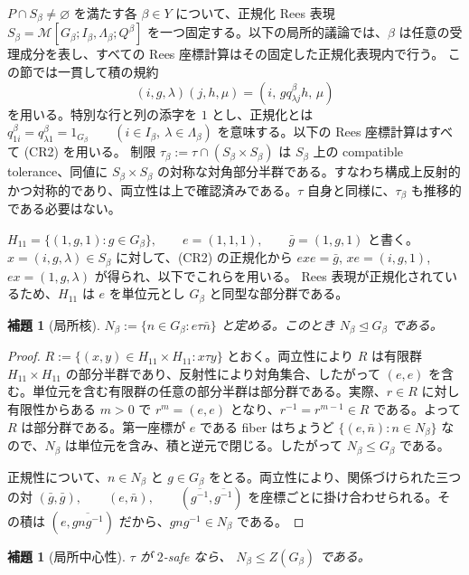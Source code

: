 \documentclass[10pt,a4paper]{ltjsarticle}
\newtheorem{lemma}[theorem]{補題}
\theoremstyle{definition}
\theoremstyle{remark}
\begin{document}
$P\cap S_\beta\ne\varnothing$ を満たす各 \(\beta\in Y\) について、正規化 Rees 表現
\(S_\beta=\mathcal M[G_\beta;I_\beta,\Lambda_\beta;Q^\beta]\)
を一つ固定する。以下の局所的議論では、\(\beta\) は任意の受理成分を表し、すべての Rees 座標計算はその固定した正規化表現内で行う。
この節では一貫して積の規約
\[
(i,g,\lambda)(j,h,\mu)
=
(i,\,gq^\beta_{\lambda j}h,\,\mu)
\tag{CR2}
\]
を用いる。特別な行と列の添字を $1$ とし、正規化とは
\(
q^\beta_{1i}=q^\beta_{\lambda 1}=1_{G_\beta}
\qquad(i\in I_\beta,\ \lambda\in\Lambda_\beta)
\)
を意味する。以下の Rees 座標計算はすべて \textup{(CR2)} を用いる。
制限
\(\tau_\beta:=\tau\cap(S_\beta\times S_\beta)\)
は $S_\beta$ 上の compatible tolerance、同値に $S_\beta\times S_\beta$ の対称な対角部分半群である。すなわち構成上反射的かつ対称的であり、両立性は上で確認済みである。$\tau$ 自身と同様に、$\tau_\beta$ も推移的である必要はない。

\(H_{11}=\{(1,g,1):g\in G_\beta\}, \qquad e=(1,1,1), \qquad \bar g=(1,g,1)\)
と書く。
\(x=(i,g,\lambda)\in S_\beta\) に対して、\textup{(CR2)} の正規化から
\(exe=\bar g\), \(xe=(i,g,1)\), \(ex=(1,g,\lambda)\)
が得られ、以下でこれらを用いる。
Rees 表現が正規化されているため、$H_{11}$ は $e$ を単位元とし $G_\beta$ と同型な部分群である。

\begin{lemma}[局所核]
\label{cr:lem:local-kernel}
\(
N_\beta:=\{n\in G_\beta:e\tau\bar n\}
\)
と定める。このとき $N_\beta\trianglelefteq G_\beta$ である。
\end{lemma}

\begin{proof}
\(R:=\{(x,y)\in H_{11}\times H_{11}:x\tau y\}\)
とおく。両立性により $R$ は有限群 $H_{11}\times H_{11}$ の部分半群であり、反射性により対角集合、したがって $(e,e)$ を含む。単位元を含む有限群の任意の部分半群は部分群である。実際、$r\in R$ に対し有限性からある $m>0$ で $r^m=(e,e)$ となり、$r^{-1}=r^{m-1}\in R$ である。よって $R$ は部分群である。第一座標が $e$ である fiber はちょうど $\{(e,\bar n):n\in N_\beta\}$ なので、$N_\beta$ は単位元を含み、積と逆元で閉じる。したがって $N_\beta\le G_\beta$ である。

正規性について、$n\in N_\beta$ と $g\in G_\beta$ をとる。両立性により、関係づけられた三つの対
\((\bar g,\bar g),\qquad (e,\bar n),\qquad (\overline{g^{-1}},\overline{g^{-1}})\)
を座標ごとに掛け合わせられる。その積は
\((e,\overline{gng^{-1}})\)
だから、$gng^{-1}\in N_\beta$ である。
\end{proof}

\begin{lemma}[局所中心性]
\label{cr:lem:local-central}
$\tau$ が $2$-safe なら、
\(N_\beta\le Z(G_\beta)\)
である。
\end{lemma}
\end{document}
